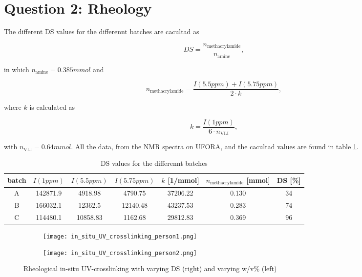 \section{Question 2: Rheology}

The different DS values for the differennt batches are cacultad as

\begin{equation}
    DS = \frac{n_{\text{methacrylamide}}}{n_{\text{amine}}},
    \label{eq:DS}
\end{equation}

in which $n_{\text{amine}} = 0.385\unit{mmol}$ and

\begin{equation}
    n_{\text{methacrylamide}} = \frac{I(5.5\unit{ppm})+I(5.75\unit{ppm})}{2\cdot k},
    \label{eq:nMA}
\end{equation}

where $k$ is calculated as

\begin{equation}
    k = \frac{I(1\unit{ppm})}{6\cdot n_{\text{VLI}}},
    \label{eq:j}
\end{equation}

with $n_{\text{VLI}}=0.64\unit{mmol}$. All the data, from the NMR spectra on UFORA, and the cacultad values are found in table \ref{tab:researcher1}.

\begin{table}[H]
    \centering
    \begin{tabular}{ccccccc}
      batch & $I(1\unit{ppm})$ & $I(5.5\unit{ppm})$ & $I(5.75\unit{ppm})$ & $k$ [1/mmol]& $n_{\text{methacrylamide}}$ [mmol] & DS [\%]\\
      \hline
      A & 142871.9 & 4918.98 & 4790.75 & 37206.22 & 0.130 & 34\\
      B & 166032.1 & 12362.5 & 12140.48 & 43237.53 & 0.283 & 74\\
      C & 114480.1 & 10858.83 & 1162.68 & 29812.83 & 0.369 & 96\\
    \end{tabular}
    \caption{DS values for the differennt batches}
    \label{tab:researcher1}
\end{table}

\begin{figure}[H]
    \centering
    \begin{subfigure}[b]{0.45\textwidth}
    \centering
    \texttt{[image: in\_situ\_UV\_crosslinking\_person1.png]}
    \end{subfigure}
    \begin{subfigure}[b]{0.45\textwidth}
    \centering
    \texttt{[image: in\_situ\_UV\_crosslinking\_person2.png]}
    \end{subfigure}
    \caption{Rheological in-situ UV-crosslinking with varying DS (right) and varying w/v\% (left)}
    \label{fig:rheo}
\end{figure}

